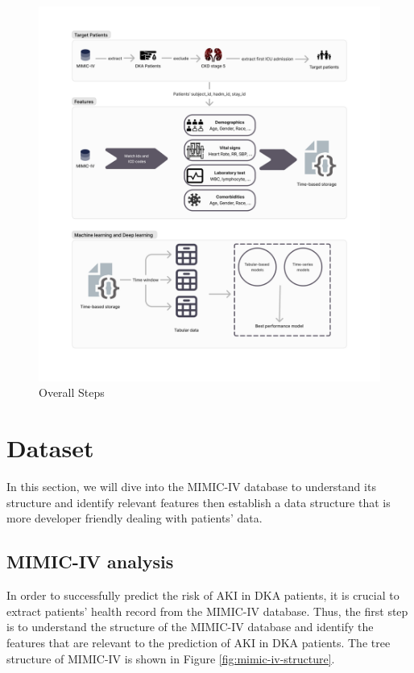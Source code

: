 \documentclass[../main.tex]{subfiles}
\begin{document}
\begin{figure}[h]
    \centering
    \includegraphics[width=\textwidth]{Figure/Overall steps.png}
    \caption{Overall Steps}
    \label{fig:overall-steps}
\end{figure}


\section{Dataset}

In this section, we will dive into the MIMIC-IV database to understand its structure and identify relevant features then establish a data structure that is more developer friendly dealing with patients' data.


\subsection{MIMIC-IV analysis}
\label{subsec:MIMIC-IV-analysis}

In order to successfully predict the risk of AKI in DKA patients, it is crucial to extract patients' health record from the MIMIC-IV database.
Thus, the first step is to understand the structure of the MIMIC-IV database and identify the features that are relevant to the prediction of AKI in DKA patients.
The tree structure of MIMIC-IV is shown in Figure \ref{fig:mimic-iv-structure}.
\end{document}
